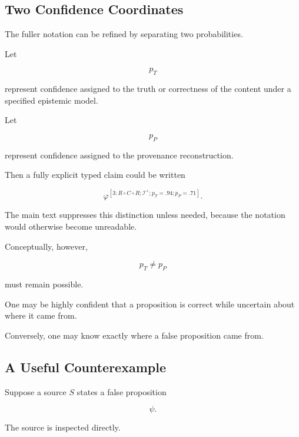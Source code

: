\documentclass[
  11pt,
  a4paper,
  DIV=12,
  BCOR=0mm,
  parskip=half-
]{scrartcl}
\theoremstyle{definition}
\theoremstyle{plain}
\theoremstyle{remark}
\begin{document}

\subsection{Two Confidence Coordinates}
\label{app:two-confidences}

The fuller notation can be refined by separating two probabilities.

Let

\[
  p_T
\]

represent confidence assigned to the truth or correctness of the content under
a specified epistemic model.

Let

\[
  p_P
\]

represent confidence assigned to the provenance reconstruction.

Then a fully explicit typed claim could be written

\[
  \varphi^{
    [3:R\circ C\circ R;
      \mathcal I^+;
      p_T=.94;
      p_P=.71]
  }.
\]

The main text suppresses this distinction unless needed, because the notation
would otherwise become unreadable.

Conceptually, however,

\[
  p_T\neq p_P
\]

must remain possible.

One may be highly confident that a proposition is correct while uncertain
about where it came from.

Conversely, one may know exactly where a false proposition came from.


\subsection{A Useful Counterexample}
\label{app:false-perfect-provenance}

Suppose a source \(S\) states a false proposition

\[
  \psi.
\]

The source is inspected directly.
\end{document}

